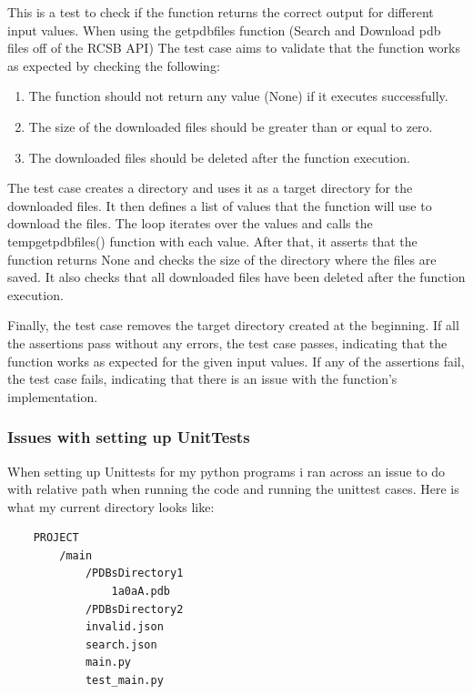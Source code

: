 \documentclass[]{final_report}
\begin{document}
This is a test to check if the function returns the correct output for different input values. When using the getpdbfiles function (Search and Download pdb files off of the RCSB API) The test case aims to validate that the function works as expected by checking the following:

\begin{enumerate}
    \item The function should not return any value (None) if it executes successfully.
    \item The size of the downloaded files should be greater than or equal to zero.
    \item The downloaded files should be deleted after the function execution.
\end{enumerate}

The test case creates a directory and uses it as a target directory for the downloaded files. It then defines a list of values that the function will use to download the files. The loop iterates over the values and calls the tempgetpdbfiles() function with each value. After that, it asserts that the function returns None and checks the size of the directory where the files are saved. It also checks that all downloaded files have been deleted after the function execution.

Finally, the test case removes the target directory created at the beginning. If all the assertions pass without any errors, the test case passes, indicating that the function works as expected for the given input values. If any of the assertions fail, the test case fails, indicating that there is an issue with the function's implementation.

\subsubsection{Issues with setting up UnitTests}

When setting up Unittests for my python programs i ran across an issue to do with relative path when running the code and running the unittest cases. Here is what my current directory looks like:

\begin{lstlisting}
    PROJECT
        /main
            /PDBsDirectory1
                1a0aA.pdb
            /PDBsDirectory2
            invalid.json
            search.json
            main.py
            test_main.py

\end{lstlisting}
\end{document}
